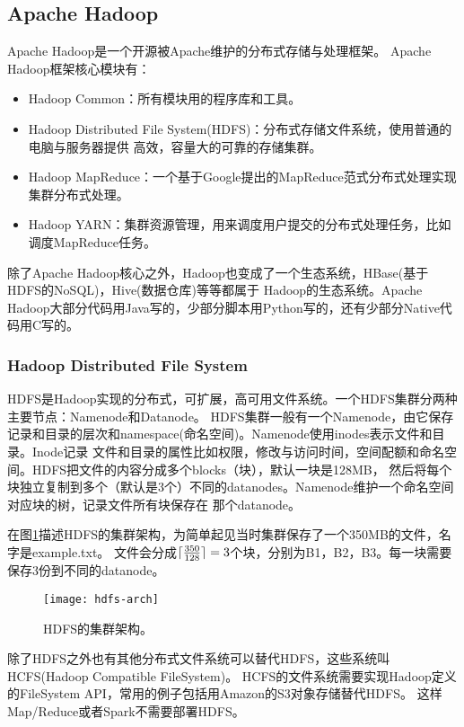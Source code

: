 \subsection{Apache Hadoop}
\label{subsubsec:hadoop}
Apache Hadoop是一个开源被Apache维护的分布式存储与处理框架。
Apache Hadoop框架核心模块有：
\begin{itemize}
  \item Hadoop Common：所有模块用的程序库和工具。
  \item Hadoop Distributed File System(HDFS)：分布式存储文件系统，使用普通的电脑与服务器提供
        高效，容量大的可靠的存储集群。
  \item Hadoop MapReduce：一个基于Google提出的MapReduce范式分布式处理实现集群分布式处理。
  \item Hadoop YARN：集群资源管理，用来调度用户提交的分布式处理任务，比如调度MapReduce任务。
\end{itemize}
除了Apache Hadoop核心之外，Hadoop也变成了一个生态系统，HBase(基于HDFS的NoSQL)，Hive(数据仓库)等等都属于
Hadoop的生态系统。Apache Hadoop大部分代码用Java写的，少部分脚本用Python写的，还有少部分Native代码用C写的。

\subsubsection{Hadoop Distributed File System}
\label{subsubsec:hdfs}
HDFS是Hadoop实现的分布式，可扩展，高可用文件系统。一个HDFS集群分两种主要节点：Namenode和Datanode。
HDFS集群一般有一个Namenode，由它保存记录和目录的层次和namespace(命名空间)。Namenode使用inodes表示文件和目录。Inode记录
文件和目录的属性比如权限，修改与访问时间，空间配额和命名空间。HDFS把文件的内容分成多个blocks（块），默认一块是128MB，
然后将每个块独立复制到多个（默认是3个）不同的datanodes。Namenode维护一个命名空间对应块的树，记录文件所有块保存在
那个datanode。

在图\ref{fig:hdfs-arch}描述HDFS的集群架构，为简单起见当时集群保存了一个350MB的文件，名字是example.txt。
文件会分成$\lceil\frac{350}{128}\rceil = 3$个块，分别为B1，B2，B3。每一块需要保存3份到不同的datanode。

\begin{figure}
  \centering
    \texttt{[image: hdfs-arch]}
    \caption{HDFS的集群架构。}
  \label{fig:hdfs-arch}
\end{figure}

除了HDFS之外也有其他分布式文件系统可以替代HDFS，这些系统叫HCFS(Hadoop Compatible FileSystem)。
HCFS的文件系统需要实现Hadoop定义的FileSystem API，常用的例子包括用Amazon的S3对象存储替代HDFS。
这样Map/Reduce或者Spark不需要部署HDFS。


